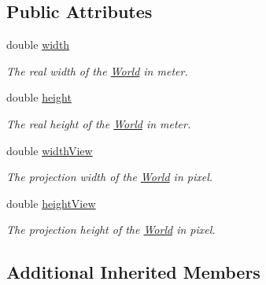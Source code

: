 \subsection*{Public Attributes}
\begin{DoxyCompactItemize}
\item 
double \hyperlink{classWorld_acbccb3a895843e63ed03d9a7f0ba04cf}{width}\hypertarget{classWorld_acbccb3a895843e63ed03d9a7f0ba04cf}{}\label{classWorld_acbccb3a895843e63ed03d9a7f0ba04cf}

\begin{DoxyCompactList}\small\item\em The real width of the \hyperlink{classWorld}{World} in meter. \end{DoxyCompactList}\item 
double \hyperlink{classWorld_a5e0272d13155839a79169c4fddd2f9a4}{height}\hypertarget{classWorld_a5e0272d13155839a79169c4fddd2f9a4}{}\label{classWorld_a5e0272d13155839a79169c4fddd2f9a4}

\begin{DoxyCompactList}\small\item\em The real height of the \hyperlink{classWorld}{World} in meter. \end{DoxyCompactList}\item 
double \hyperlink{classWorld_aa2de6ef451e67aac4bf028923083cd62}{width\+View}\hypertarget{classWorld_aa2de6ef451e67aac4bf028923083cd62}{}\label{classWorld_aa2de6ef451e67aac4bf028923083cd62}

\begin{DoxyCompactList}\small\item\em The projection width of the \hyperlink{classWorld}{World} in pixel. \end{DoxyCompactList}\item 
double \hyperlink{classWorld_ae39d4731ecb9e398b60e410e137f860e}{height\+View}\hypertarget{classWorld_ae39d4731ecb9e398b60e410e137f860e}{}\label{classWorld_ae39d4731ecb9e398b60e410e137f860e}

\begin{DoxyCompactList}\small\item\em The projection height of the \hyperlink{classWorld}{World} in pixel. \end{DoxyCompactList}\end{DoxyCompactItemize}
\subsection*{Additional Inherited Members}


